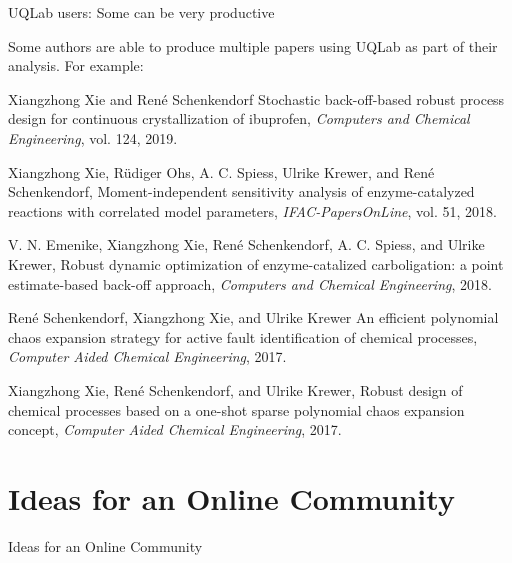 \documentclass[]{rsuqbeamernew}
\begin{document}
\begin{frame}[t]{UQLab users: Some can be very productive}
  
Some authors are able to produce multiple papers using UQLab as part of their analysis.
For example:

  \begin{thebibliography}{Dijkstra, 1982}
    \footnotesize{
    Xiangzhong Xie and Ren\'e Schenkendorf
    \newblock Stochastic back-off-based robust process design for continuous crystallization of ibuprofen, {\em Computers and Chemical Engineering}, vol. 124, 2019.
    
    Xiangzhong Xie, R\"udiger Ohs, A. C. Spiess, Ulrike Krewer, and Ren\'e Schenkendorf,
    \newblock Moment-independent sensitivity analysis of enzyme-catalyzed reactions with correlated model parameters, {\em IFAC-PapersOnLine}, vol. 51, 2018.
    
    V. N. Emenike, Xiangzhong Xie, Ren\'e Schenkendorf, A. C. Spiess, and Ulrike Krewer,
    \newblock Robust dynamic optimization of enzyme-catalized carboligation: a point estimate-based back-off approach, {\em Computers and Chemical Engineering}, 2018.
  
    Ren\'e Schenkendorf, Xiangzhong Xie, and Ulrike Krewer
    \newblock An efficient polynomial chaos expansion strategy for active fault identification of chemical processes, {\em Computer Aided Chemical Engineering}, 2017.

    Xiangzhong Xie, Ren\'e Schenkendorf, and Ulrike Krewer,
    \newblock Robust design of chemical processes based on a one-shot sparse polynomial chaos expansion concept, {\em Computer Aided Chemical Engineering}, 2017.}
  \end{thebibliography}
\end{frame}

\section{Ideas for an Online Community}

\begin{frame}[t]{Ideas for an Online Community}

\end{frame}
\end{document}
